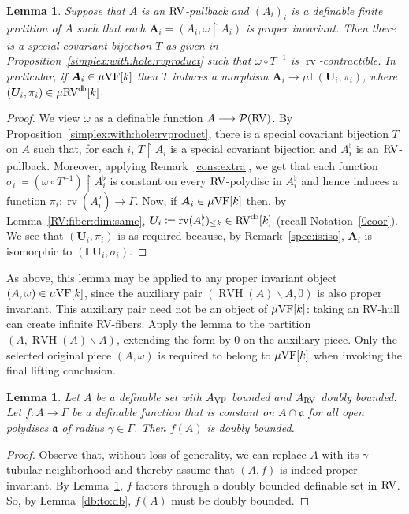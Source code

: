 \documentclass[12pt]{amsart}
\theoremstyle{plain}
\newtheorem{lem}[thm]{Lemma}
\theoremstyle{definition}
\theoremstyle{remark}
\numberwithin{equation}{section}
\theoremstyle{plain}
\newcommand{\VF}{\textup{VF}}
\newcommand{\RV}{\textup{RV}}
\newcommand{\ga}{\mathfrak{a}}
\newcommand{\0}{\emptyset}
\newcommand{\mdl}[1]{\mathcal{#1}}  %
\newcommand{\bb}[1]{\mathbb{#1}}
\newcommand{\rest}{\upharpoonright}
\newcommand{\fun}{\longrightarrow}
\newcommand{\mi}{\smallsetminus}
\newcommand{\mVF}{{\mu}{\VF}}
\newcommand{\mRV}{{\mu}{\RV}}
\newcommand{\mL}{{\mu}{\bb L}}
\DeclareMathOperator{\rv}{rv}
\DeclareMathOperator{\RVH}{RVH}
\DeclareMathOperator{\db}{d \! b}
\begin{document}
\begin{lem}\label{L:measure:surjective}
Suppose that $A$ is an $\RV$-pullback and  $(A_i)_i$ is a definable finite partition of $A$ such that each $\bm A_i = (A_i, \omega \rest A_i)$ is proper invariant. Then there is a special covariant bijection $T$ as given in Proposition~\ref{simplex:with:hole:rvproduct} such that $\omega \circ T^{-1}$ is $\rv$-contractible. In particular, if $\bm A_i \in \mVF[k]$ then $T$ induces a morphism  $\bm A_i \fun \mL(\bm U_i, \pi_i)$, where $(\bm U_i, \pi_i) \in \mRV^{\db}[k]$.
\end{lem}
\begin{proof}
We view $\omega$ as a definable function $A \fun \mdl P(\RV)$. By Proposition~\ref{simplex:with:hole:rvproduct}, there is a special covariant bijection $T$ on $A$ such that, for each $i$, $T \rest A_{i}$ is a special covariant bijection and $A_{i}^\flat$ is an $\RV$-pullback. Moreover, applying Remark~\ref{cons:extra}, we get that each function $\sigma_i \coloneqq (\omega \circ T^{-1}) \rest A_{i}^\flat$ is constant on every $\RV$-polydisc in $A_{i}^\flat$ and hence induces a function $\pi_i : \rv(A_{i}^\flat) \fun \Gamma$. Now, if $\bm A_i \in \mVF[k]$ then, by Lemma~\ref{RV:fiber:dim:same}, $\bm U_i\coloneqq \rv(A_{i}^\flat)_{\leq k} \in \RV^{\db}[k]$ (recall Notation~\ref{0coor}). We see that $(\bm U_i, \pi_i)$ is as required because, by Remark~\ref{spec:is:iso}, $\bm A_i$ is isomorphic to $(\mathbb{L} \bm U_i, \sigma_i)$.
\end{proof}


As above, this lemma may be applied to any proper invariant object $(A, \omega) \in \mVF[k]$, since the auxiliary pair $(\RVH(A)\mi A,0)$ is also proper invariant. This auxiliary pair need not be an object of $\mVF[k]$: taking an RV-hull can create infinite RV-fibers. Apply the lemma to the partition $(A,\RVH(A)\mi A)$, extending the form by $0$ on the auxiliary piece. Only the selected original piece $(A,\omega)$ is required to belong to $\mVF[k]$ when invoking the final lifting conclusion.


\begin{lem}\label{invar:db}
Let $A$ be a definable set with $A_{\VF}$  bounded and $A_{\RV}$  doubly bounded. Let $f : A \fun \Gamma$ be a definable function  that is constant on $A \cap \ga$ for all open polydiscs $\ga$ of radius $\gamma \in \Gamma$. Then $f(A)$ is doubly bounded.
\end{lem}
\begin{proof}
Observe that, without loss of generality, we can replace $A$ with its $\gamma$-tubular neighborhood and thereby  assume that $(A,f)$ is indeed proper invariant. By Lemma~\ref{L:measure:surjective}, $f$ factors through a doubly bounded definable set in $\RV$. So, by Lemma~\ref{db:to:db},  $f(A)$ must be doubly bounded.
\end{proof}
\end{document}
